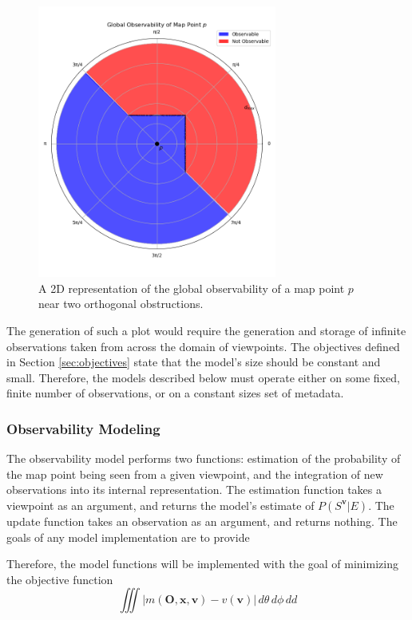 \begin{figure}[!ht]
    \centering
    \includegraphics[width=0.7\textwidth]{resources/global_observability_p.png}
    \caption[2D Global Observability]{A 2D representation of the global observability of a map point $p$ near two orthogonal obstructions.}
    \label{fig:global_observability_p}
\end{figure}

The generation of such a plot would require the generation and storage of infinite observations taken from across the domain of viewpoints. The objectives defined in Section \ref{sec:objectives} state that the model's size should be constant and small. Therefore, the models described below must operate either on some fixed, finite number of observations, or on a constant sizes set of metadata.

\subsubsection{Observability Modeling}

The observability model performs two functions: estimation of the probability of the map point being seen from a given viewpoint, and the integration of new observations into its internal representation. The estimation function takes a viewpoint as an argument, and returns the model's estimate of $P(S^{\boldsymbol{v}}|E)$. The update function takes an observation as an argument, and returns nothing. The goals of any model implementation are to provide 

Therefore, the model functions will be implemented with the goal of minimizing the objective function
$$
    \iiint |m(\boldsymbol{O},\boldsymbol{x},\boldsymbol{v}) - v(\boldsymbol{v})| \,d\theta\,d\phi\,dd
$$

